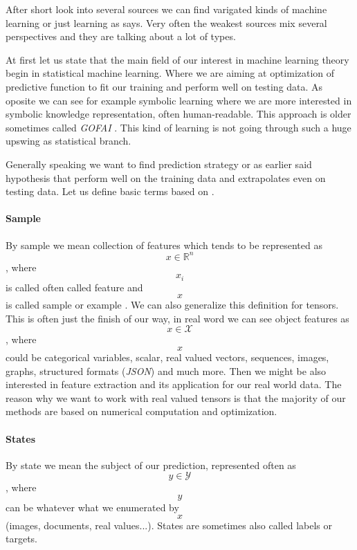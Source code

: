 After short look into several sources we can find varigated kinds of machine learning or just learning as \cite{Russell2009} says. Very often the weakest sources mix several perspectives and they are talking about a lot of types.

At first let us state that the main field of our interest in machine learning theory begin in statistical machine learning. Where we are aiming at optimization of predictive function to fit our training and perform well on testing data. As oposite we can see for example symbolic learning where we are more interested in symbolic knowledge representation, often human-readable. This approach is older sometimes called \emph{GOFAI} \cite{Haugeland1985}. This kind of learning is not going through such a huge upswing as statistical branch.

Generally speaking we want to find prediction strategy or as earlier said hypothesis that perform well on the training data and extrapolates even on testing data. Let us define basic terms based on \cite{Franc2020}.


\paragraph{Sample}
By sample we mean collection of features which tends to be represented as $$x \in \mathbb{R}^{n}$$, where $$x_i$$ is called often called feature and $$x$$ is called sample or example \cite{GoodBengCour16}. We can also generalize this definition for tensors.
This is often just the finish of our way, in real word we can see object features as $$x \in \mathcal{X}$$, where $$x$$ could be categorical variables, scalar, real valued vectors, sequences, images, graphs, structured formats (\emph{JSON}) and much more. Then we might be also interested in feature extraction and its application for our real world data. The reason why we want to work with real valued tensors is that the majority of our methods are based on numerical computation and optimization. 
\paragraph{States}
By state we mean the subject of our prediction, represented often as $$y \in \mathcal{Y}$$, where $$y$$ can be whatever what we enumerated by $$x$$ (images, documents, real values...). States are sometimes also called labels or targets. 
